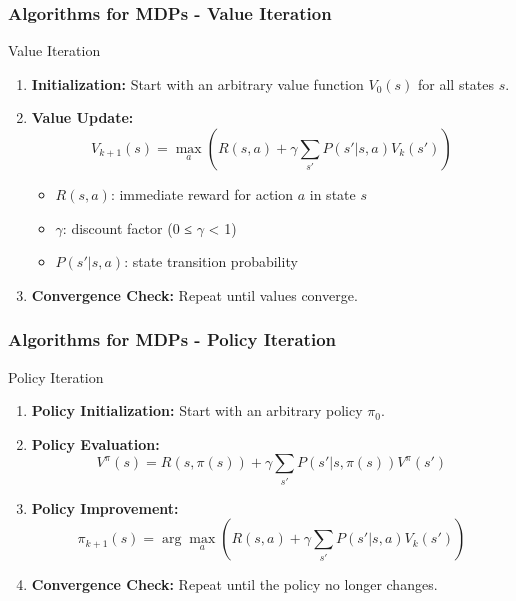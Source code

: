 \documentclass[aspectratio=169]{beamer}
\begin{document}
\begin{frame}[fragile]
    \frametitle{Algorithms for MDPs - Value Iteration}
    \begin{block}{Value Iteration}
        \begin{enumerate}
            \item \textbf{Initialization:} Start with an arbitrary value function \( V_0(s) \) for all states \( s \).
            \item \textbf{Value Update:}
            \begin{equation}
            V_{k+1}(s) = \max_a \left( R(s, a) + \gamma \sum_{s'} P(s'|s, a)V_k(s') \right)
            \end{equation}
            \begin{itemize}
                \item \( R(s, a) \): immediate reward for action \( a \) in state \( s \)
                \item \( \gamma \): discount factor (0 ≤ \( \gamma \) < 1)
                \item \( P(s'|s, a) \): state transition probability
            \end{itemize}
            \item \textbf{Convergence Check:} Repeat until values converge.
        \end{enumerate}
    \end{block}
\end{frame}

\begin{frame}[fragile]
    \frametitle{Algorithms for MDPs - Policy Iteration}
    \begin{block}{Policy Iteration}
        \begin{enumerate}
            \item \textbf{Policy Initialization:} Start with an arbitrary policy \( \pi_0 \).
            \item \textbf{Policy Evaluation:}
            \begin{equation}
            V^{\pi}(s) = R(s, \pi(s)) + \gamma \sum_{s'} P(s'|s, \pi(s)) V^{\pi}(s')
            \end{equation}
            \item \textbf{Policy Improvement:}
            \begin{equation}
            \pi_{k+1}(s) = \arg\max_a \left( R(s, a) + \gamma \sum_{s'} P(s'|s, a)V_k(s') \right)
            \end{equation}
            \item \textbf{Convergence Check:} Repeat until the policy no longer changes.
        \end{enumerate}
    \end{block}
\end{frame}
\end{document}
